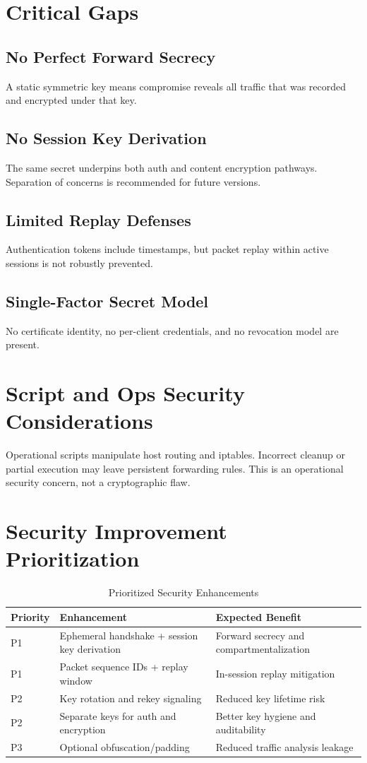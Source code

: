 \section{Critical Gaps}
\subsection{No Perfect Forward Secrecy}
A static symmetric key means compromise reveals all traffic that was recorded and encrypted under that key.

\subsection{No Session Key Derivation}
The same secret underpins both auth and content encryption pathways. Separation of concerns is recommended for future versions.

\subsection{Limited Replay Defenses}
Authentication tokens include timestamps, but packet replay within active sessions is not robustly prevented.

\subsection{Single-Factor Secret Model}
No certificate identity, no per-client credentials, and no revocation model are present.

\section{Script and Ops Security Considerations}
Operational scripts manipulate host routing and iptables. Incorrect cleanup or partial execution may leave persistent forwarding rules. This is an operational security concern, not a cryptographic flaw.

\section{Security Improvement Prioritization}
\begin{table}[H]
\centering
\caption{Prioritized Security Enhancements}
\begin{tabular}{p{}p{}p{}}
\toprule
\textbf{Priority} & \textbf{Enhancement} & \textbf{Expected Benefit} \\
\midrule
P1 & Ephemeral handshake + session key derivation & Forward secrecy and compartmentalization \\
P1 & Packet sequence IDs + replay window & In-session replay mitigation \\
P2 & Key rotation and rekey signaling & Reduced key lifetime risk \\
P2 & Separate keys for auth and encryption & Better key hygiene and auditability \\
P3 & Optional obfuscation/padding & Reduced traffic analysis leakage \\
\bottomrule
\end{tabular}
\end{table}

